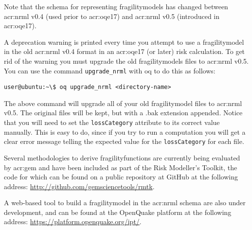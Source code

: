 \begin{itemize}
\end{itemize}


Note that the schema for representing \glspl{fragilitymodel} has changed
between \gls{acr:nrml} v0.4 (used prior to \gls{acr:oqe17}) and \gls{acr:nrml}
v0.5 (introduced in \gls{acr:oqe17}).

A deprecation warning is printed every time you attempt to use a
\gls{fragilitymodel} in the old \gls{acr:nrml} v0.4 format in an
\gls{acr:oqe17} (or later) risk calculation. To get rid of the warning you
must upgrade the old \glspl{fragilitymodel} files to \gls{acr:nrml} v0.5. You
can use the command \Verb+upgrade_nrml+ with oq to do this as follows:

\begin{verbatim}
user@ubuntu:~\$ oq upgrade_nrml <directory-name>
\end{verbatim}

The above command will upgrade all of your old \gls{fragilitymodel} files to
\gls{acr:nrml} v0.5. The original files will be kept, but with a .bak extension
appended. Notice that you will need to set the \Verb+lossCategory+ attribute
to its correct value manually. This is easy to do, since if you try to run a
computation you will get a clear error message telling the expected value for
the \Verb+lossCategory+ for each file.


Several methodologies to derive \glspl{fragilityfunction} are currently being
evaluated by \gls{acr:gem} and have been included as part of the Risk
Modeller's Toolkit, the code for which can be found on a public repository at
GitHub at the following address: 
\href{http://github.com/gemsciencetools/rmtk}{http://github.com/gemsciencetools/rmtk}.

A web-based tool to build a \gls{fragilitymodel} in the \gls{acr:nrml} schema
are also under development, and can be found at the OpenQuake platform at the
following address: \href{https://platform.openquake.org/ipt/}{https://platform.openquake.org/ipt/}.
